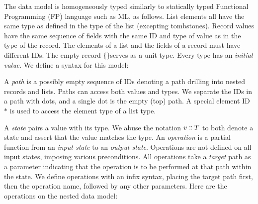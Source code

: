 \documentclass[english,submission]{programming}
\theoremstyle{definition}
\newcommand{\mathbox}[1]{\colorbox{black!10}{$#1$}}
\newcommand{\is}{{:}\ }
\newcommand{\isa}{\dblcolon}
\newcommand{\emptystring}{\textsf{\textquotedbl\ \!\textquotedbl}}
\begin{document}
The data model is homogeneously typed similarly to statically typed Functional Programming (FP) language such as ML, as follows. List elements all have the same type as defined in the type of the list (excepting tombstones). Record values have the same sequence of fields with the same ID and type of value as in the type of the record. The elements of a list and the fields of a record must have different IDs.
The empty record \mathbox{\text{\{\}}}serves as a unit type. Every type has an \textit{initial value}. We define a syntax for this model:

\tcbox{
\[ \begin{array}{r@{\ }l|r@{\ }l|r@{\ }l|l}
  \multicolumn{2}{l|}{\textrm{type}} & \multicolumn{2}{l|}{\textrm{value}} & \multicolumn{2}{l|}{\textrm{initial value}}&\\
  \hline
  T \Coloneqq & & v \Coloneqq & & T^\varnothing = & &\\
  &  \textsf{String} & & S & & \emptystring & \textrm{string}\\
  & \textsf{Number} & &  N & & \textsf{NaN} & \textrm{number}\\
  & \textsf{List } T & & [ E \is v \  \dots ] & & [] & \textrm{list}\\
  & \{ F \  S \is T \  \dots \} & & \{ F \is v \  \dots \} & & \{ F \is T^\varnothing \  \dots \}& \textrm{record}\\

  & \bot && \bigtimes & & \bigtimes & \textrm{tombstone}\\
\end{array}\]
}

A \textit{path} is a possibly empty sequence of IDs denoting a path drilling into nested records and lists. Paths can access both values and types. We separate the IDs in a path with dots, and a single dot is the empty (top) path. A special element ID~\mathbox{*} is used to access the element type of a list type.

A \textit{state} pairs a value with its type. We abuse the notation \mathbox{v \isa T} to both denote a state and assert that the value matches the type.
An \textit{operation} is a partial function from an \textit{input state} to an \textit{output state}. Operations are not defined on all input states, imposing various preconditions.
All operations take a \textit{target} path as a parameter indicating that the operation is to be performed at that path within the state.
We define operations with an infix syntax, placing the target path first, then the operation name, followed by any other parameters. Here are the operations on the nested data model:
\end{document}
